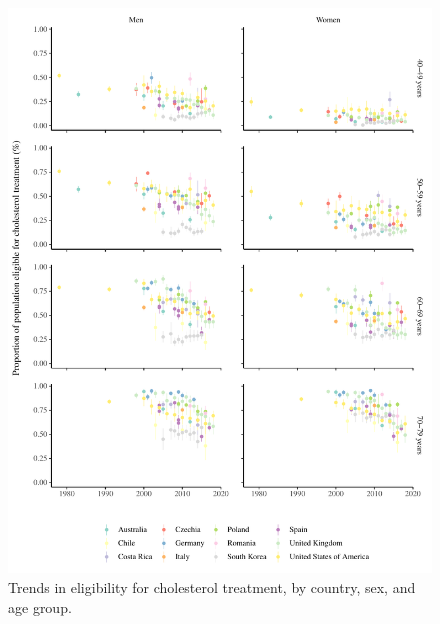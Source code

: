 \documentclass[12pt]{article}
\begin{document}
\begin{figure}[hp]
    \centering
    \includegraphics[width=\textwidth]{../3_figures/fig2_eligible.pdf}
    \caption{Trends in eligibility for cholesterol treatment, by country, sex, and age group.}
    \label{fig:eligible}
\end{figure}
\end{document}

